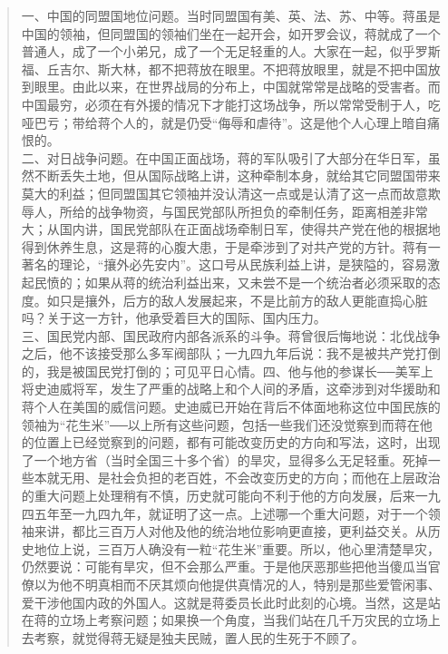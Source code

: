 \begin{quote}
	一、中国的同盟国地位问题。当时同盟国有美、英、法、苏、中等。蒋虽是中国的领袖，但同盟国的领袖们坐在一起开会，如开罗会议，蒋就成了一个普通人，成了一个小弟兄，成了一个无足轻重的人。大家在一起，似乎罗斯福、丘吉尔、斯大林，都不把蒋放在眼里。不把蒋放眼里，就是不把中国放到眼里。由此以来，在世界战局的分布上，中国就常常是战略的受害者。而中国最穷，必须在有外援的情况下才能打这场战争，所以常常受制于人，吃哑巴亏；带给蒋个人的，就是仍受“侮辱和虐待”。这是他个人心理上暗自痛恨的。\\

二、对日战争问题。在中国正面战场，蒋的军队吸引了大部分在华日军，虽然不断丢失土地，但从国际战略上讲，这种牵制本身，就给其它同盟国带来莫大的利益；但同盟国其它领袖并没认清这一点或是认清了这一点而故意欺辱人，所给的战争物资，与国民党部队所担负的牵制任务，距离相差非常大；从国内讲，国民党部队在正面战场牵制日军，使得共产党在他的根据地得到休养生息，这是蒋的心腹大患，于是牵涉到了对共产党的方针。蒋有一著名的理论，“攘外必先安内”。这口号从民族利益上讲，是狭隘的，容易激起民愤的；如果从蒋的统治利益出来，又未尝不是一个统治者必须采取的态度。如只是攘外，后方的敌人发展起来，不是比前方的敌人更能直捣心脏吗？关于这一方针，他承受着巨大的国际、国内压力。\\

三、国民党内部、国民政府内部各派系的斗争。蒋曾很后悔地说：北伐战争之后，他不该接受那么多军阀部队；一九四九年后说：我不是被共产党打倒的，我是被国民党打倒的；可见平日心情。四、他与他的参谋长──美军上将史迪威将军，发生了严重的战略上和个人间的矛盾，这牵涉到对华援助和蒋个人在美国的威信问题。史迪威已开始在背后不体面地称这位中国民族的领袖为“花生米”──以上所有这些问题，包括一些我们还没觉察到而蒋在他的位置上已经觉察到的问题，都有可能改变历史的方向和写法，这时，出现了一个地方省（当时全国三十多个省）的旱灾，显得多么无足轻重。死掉一些本就无用、是社会负担的老百姓，不会改变历史的方向；而他在上层政治的重大问题上处理稍有不慎，历史就可能向不利于他的方向发展，后来一九四五年至一九四九年，就证明了这一点。上述哪一个重大问题，对于一个领袖来讲，都比三百万人对他及他的统治地位影响更直接，更利益交关。从历史地位上说，三百万人确没有一粒“花生米”重要。所以，他心里清楚旱灾，仍然要说：可能有旱灾，但不会那么严重。于是他厌恶那些把他当傻瓜当官僚以为他不明真相而不厌其烦向他提供真情况的人，特别是那些爱管闲事、爱干涉他国内政的外国人。这就是蒋委员长此时此刻的心境。当然，这是站在蒋的立场上考察问题；如果换一个角度，当我们站在几千万灾民的立场上去考察，就觉得蒋无疑是独夫民贼，置人民的生死于不顾了。\\
\end{quote}

